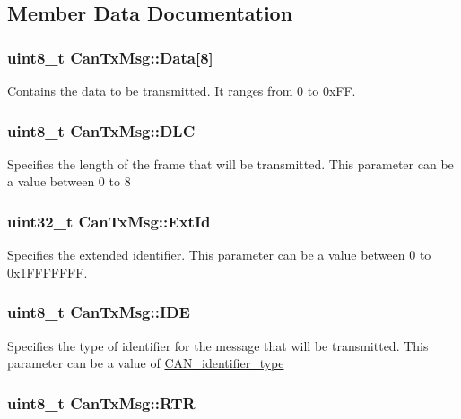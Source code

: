 \subsection{Member Data Documentation}
\hypertarget{structCanTxMsg_aabfbf718f627da26d9e3cf903dc0ad02}{
\subsubsection[{Data}]{\setlength{\rightskip}{0pt plus 5cm}uint8\_\-t {\bf CanTxMsg::Data}\mbox{[}8\mbox{]}}}
\label{structCanTxMsg_aabfbf718f627da26d9e3cf903dc0ad02}
Contains the data to be transmitted. It ranges from 0 to 0xFF. \hypertarget{structCanTxMsg_ab49d0fa602aad2fd9cd007adafc11fc2}{
\subsubsection[{DLC}]{\setlength{\rightskip}{0pt plus 5cm}uint8\_\-t {\bf CanTxMsg::DLC}}}
\label{structCanTxMsg_ab49d0fa602aad2fd9cd007adafc11fc2}
Specifies the length of the frame that will be transmitted. This parameter can be a value between 0 to 8 \hypertarget{structCanTxMsg_a33050a95a4cc463b589ff16bdd416f22}{
\subsubsection[{ExtId}]{\setlength{\rightskip}{0pt plus 5cm}uint32\_\-t {\bf CanTxMsg::ExtId}}}
\label{structCanTxMsg_a33050a95a4cc463b589ff16bdd416f22}
Specifies the extended identifier. This parameter can be a value between 0 to 0x1FFFFFFF. \hypertarget{structCanTxMsg_aa4c8568a0e3250a17bd7e116b3e09670}{
\subsubsection[{IDE}]{\setlength{\rightskip}{0pt plus 5cm}uint8\_\-t {\bf CanTxMsg::IDE}}}
\label{structCanTxMsg_aa4c8568a0e3250a17bd7e116b3e09670}
Specifies the type of identifier for the message that will be transmitted. This parameter can be a value of \hyperlink{group__CAN__identifier__type}{CAN\_\-identifier\_\-type} \hypertarget{structCanTxMsg_a69f84255db38c6910058f290efdb7302}{
\subsubsection[{RTR}]{\setlength{\rightskip}{0pt plus 5cm}uint8\_\-t {\bf CanTxMsg::RTR}}}
